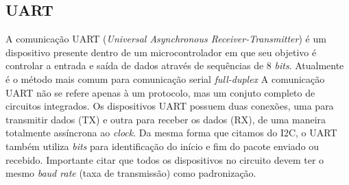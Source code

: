 \documentclass[../../layout.tex]{subfiles}
\begin{document}
\subsection{UART}
\hspace*{3em}A comunicação UART (\emph{Universal Asynchronous Receiver-Transmitter}) é um dispositivo presente dentro de um microcontrolador em que seu objetivo é controlar a entrada e saída de dados através de sequências de 8 \emph{bits}. Atualmente é o método mais comum para comunicação serial \emph{full-duplex} \cite{uart} A comunicação UART não se refere apenas à um protocolo, mas um conjuto completo de circuitos integrados. Os dispositivos UART possuem duas conexões, uma para transmitir dados (TX) e outra para receber os dados (RX), de uma maneira totalmente assíncrona ao \emph{clock}. Da mesma forma que citamos do I2C, o UART também utiliza \emph{bits} para identificação do início e fim do pacote enviado ou recebido. Importante citar que todos os dispositivos no circuito devem ter o mesmo \emph{baud rate} (taxa de transmissão) como padronização.
\end{document}
